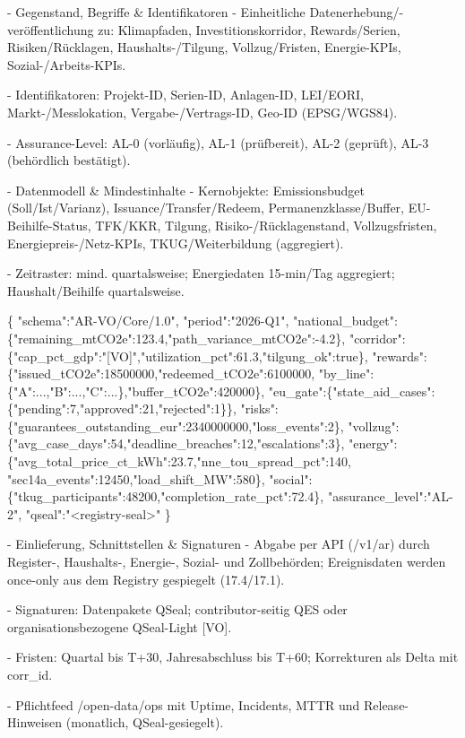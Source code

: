 \documentclass[12pt,a4paper]{scrartcl}
\begin{document}
- Gegenstand, Begriffe \& Identifikatoren
- Einheitliche Datenerhebung/-veröffentlichung zu: Klimapfaden, Investitionskorridor, Rewards/Serien, Risiken/Rücklagen, Haushalts-/Tilgung, Vollzug/Fristen, Energie-KPIs, Sozial-/Arbeits-KPIs.

- Identifikatoren: Projekt-ID, Serien-ID, Anlagen-ID, LEI/EORI, Markt-/Messlokation, Vergabe-/Vertrags-ID, Geo-ID (EPSG/WGS84).

- Assurance-Level: AL-0 (vorläufig), AL-1 (prüfbereit), AL-2 (geprüft), AL-3 (behördlich bestätigt).

- Datenmodell \& Mindestinhalte
- Kernobjekte: Emissionsbudget (Soll/Ist/Varianz), Issuance/Transfer/Redeem, Permanenzklasse/Buffer, EU-Beihilfe-Status, TFK/KKR, Tilgung, Risiko-/Rücklagenstand, Vollzugsfristen, Energiepreis-/Netz-KPIs, TKUG/Weiterbildung (aggregiert).

- Zeitraster: mind. quartalsweise; Energiedaten 15-min/Tag aggregiert; Haushalt/Beihilfe quartalsweise.

\{
  "schema":"AR-VO/Core/1.0",
  "period":"2026-Q1",
  "national\_budget":\{"remaining\_mtCO2e":123.4,"path\_variance\_mtCO2e":-4.2\},
  "corridor":\{"cap\_pct\_gdp":"[VO]","utilization\_pct":61.3,"tilgung\_ok":true\},
  "rewards":\{"issued\_tCO2e":18500000,"redeemed\_tCO2e":6100000,
             "by\_line":\{"A":...,"B":...,"C":...\},"buffer\_tCO2e":420000\},
  "eu\_gate":\{"state\_aid\_cases":\{"pending":7,"approved":21,"rejected":1\}\},
  "risks":\{"guarantees\_outstanding\_eur":2340000000,"loss\_events":2\},
  "vollzug":\{"avg\_case\_days":54,"deadline\_breaches":12,"escalations":3\},
  "energy":\{"avg\_total\_price\_ct\_kWh":23.7,"nne\_tou\_spread\_pct":140,
            "sec14a\_events":12450,"load\_shift\_MW":580\},
  "social":\{"tkug\_participants":48200,"completion\_rate\_pct":72.4\},
  "assurance\_level":"AL-2",
  "qseal":"<registry-seal>"
\}

- Einlieferung, Schnittstellen \& Signaturen
- Abgabe per API (/v1/ar) durch Register-, Haushalts-, Energie-, Sozial- und Zollbehörden; Ereignisdaten werden once-only aus dem Registry gespiegelt (17.4/17.1).

- Signaturen: Datenpakete QSeal; contributor-seitig QES oder organisationsbezogene QSeal-Light [VO].

- Fristen: Quartal bis T+30, Jahresabschluss bis T+60; Korrekturen als Delta mit corr\_id.

- Pflichtfeed /open-data/ops mit Uptime, Incidents, MTTR und Release-Hinweisen (monatlich, QSeal-gesiegelt).
\end{document}
